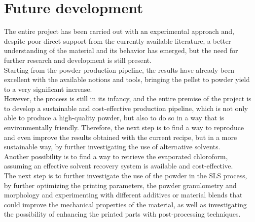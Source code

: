\documentclass{article}
\begin{document}
    \clearpage
    \section{Future development\label{Future_development_and_research}}

    The entire project has been carried out with an experimental approach and, despite poor direct support 
    from the currently available literature, a better understanding of 
    the material and its behavior has emerged, but the need for further research and development is still 
    present. \\ 

    Starting from the powder production pipeline, the results have already been excellent with the available notions and tools, bringing 
    the pellet to powder yield to a very significant increase. \\ 

    However, the process is still in its infancy, and the entire premise of the project is to develop a sustainable 
    and cost-effective production pipeline, which is not only able to produce a high-quality powder, but also 
    to do so in a way that is environmentally friendly. Therefore, the next step is to find a way to reproduce and 
    even improve the results obtained with the current recipe, but in a more sustainable way, by further 
    investigating the use of alternative solvents. \\ 

    Another possibility is to find a way to retrieve the evaporated chloroform, assuming an effective solvent recovery 
    system is available and cost-effective. \\ 

    The next step is to further investigate the use of the powder in the SLS process, by further optimizing the 
    printing parameters, the powder granulometry and morphology and experimenting with different additives or material blends that 
    could improve the mechanical properties of the material, as well as investigating the possibility of enhancing the printed parts 
    with post-processing techniques. \\ 


    \clearpage


    \printbibliography
\end{document}
